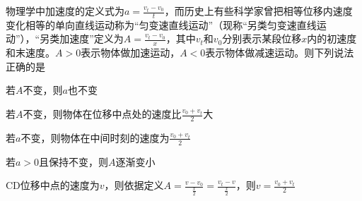 物理学中加速度的定义式为\(a = \frac{v_t - v_0}{t}\)，而历史上有些科学家曾把相等位移内速度变化相等的单向直线运动称为“匀变速直线运动”（现称“另类匀变速直线运动”），“另类加速度”定义为\(A = \frac{v_t - v_0}{x}\)，其中\(v_t\)和\(v_0\)分别表示某段位移\(x\)内的初速度和末速度。\(A > 0\)表示物体做加速运动，\(A < 0\)表示物体做减速运动。则下列说法正确的是\paren[CD]
\begin{choices}
  \item 若\(A\)不变，则\(a\)也不变
  \item 若\(A\)不变，则物体在位移中点处的速度比\(\frac{v_0 + v_t}{2}\)大
  \item 若\(a\)不变，则物体在中间时刻的速度为\(\frac{v_0 + v_t}{2}\)
  \item 若\(a > 0\)且保持不变，则\(A\)逐渐变小
\end{choices}
\begin{answer}
  CD\qquad \kaishu 位移中点的速度为\(v\)，则依据定义\(A = \frac{v - v_0}{\frac{x}{2}} = \frac{v_t - v}{\frac{x}{2}}\)，则\(v = \frac{v_0 + v_t}{2}\)
\end{answer}